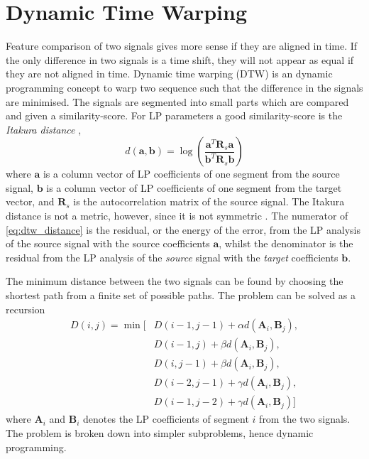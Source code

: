 \section{Dynamic Time Warping} %
\label{sec:dynamic_time_warping}
Feature comparison of two signals gives more sense if they are aligned in time. If the only difference in two signals is a time shift, they will not appear as equal if they are not aligned in time. Dynamic time warping (DTW) is an dynamic programming concept to warp two sequence such that the difference in the signals are minimised. The signals are segmented into small parts which are compared and given a similarity-score. For LP parameters a good similarity-score is the \emph{Itakura distance} \cite{itakura90},
\begin{equation}
	\label{eq:dtw_distance}
		d(\mathbf{a},\mathbf{b}) = \log\left(\frac{\mathbf{a}^T \mathbf{R}_s \mathbf{a}}{\mathbf{b}^T \mathbf{R}_s \mathbf{b}}\right)	
\end{equation}
where $\mathbf{a}$ is a column vector of LP coefficients of one segment from the source signal, $\mathbf{b}$ is a column vector of LP coefficients of one segment from the target vector, and $\mathbf{R}_s$ is the autocorrelation matrix of the source signal. The Itakura distance is not a metric, however, since it is not symmetric \cite{kreyszig78}. The numerator of \eqref{eq:dtw_distance} is the residual, or the energy of the error, from the LP analysis of the source signal with the source coefficients $\mathbf{a}$, whilst the denominator is the residual from the LP analysis of the \emph{source} signal with the \emph{target} coefficients $\mathbf{b}$. 

The minimum distance between the two signals can be found by choosing the shortest path from a finite set of possible paths. The problem can be solved as a recursion \cite{taletek}
\begin{equation}
	\label{eq:dtw_recursion}
	\begin{split}
		D(i,j) = \min \bigl[&D(i-1,j-1)+\alpha d(\mathbf{A}_i,\mathbf{B}_j),\\
		& D(i-1,j)+\beta d(\mathbf{A}_i,\mathbf{B}_j),\\
		& D(i,j-1)+\beta d(\mathbf{A}_i,\mathbf{B}_j),\\
		& D(i-2,j-1)+\gamma d(\mathbf{A}_i,\mathbf{B}_j),\\
		& D(i-1,j-2)+\gamma d(\mathbf{A}_i,\mathbf{B}_j)\bigr]		
	\end{split}
\end{equation}
where $\mathbf{A}_i$ and $\mathbf{B}_i$ denotes the LP coefficients of segment $i$ from the two signals. 
The problem is broken down into simpler subproblems, hence dynamic programming. 

